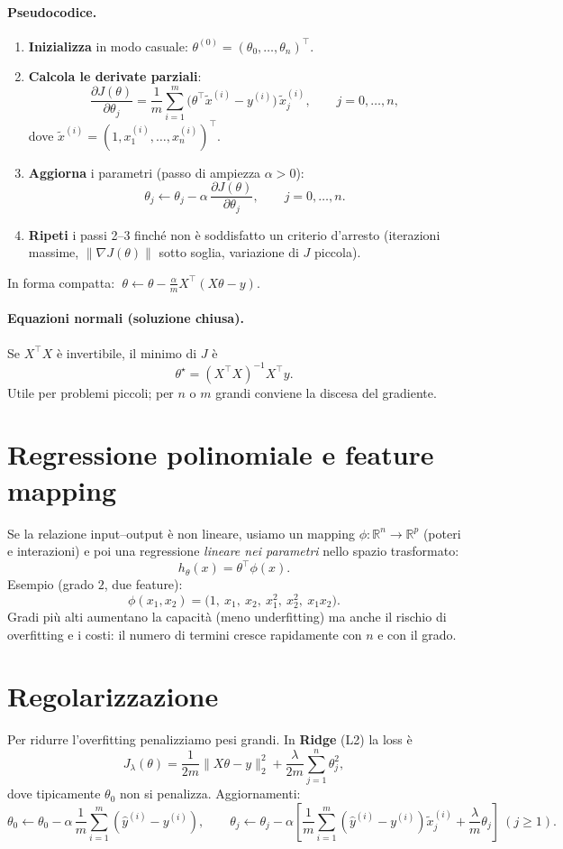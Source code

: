 \paragraph{Pseudocodice.}
\begin{enumerate}
  \item \textbf{Inizializza} in modo casuale: \(\theta^{(0)}=(\theta_0,\ldots,\theta_n)^\top\).
  \item \textbf{Calcola le derivate parziali}:
  \[
  \frac{\partial J(\theta)}{\partial \theta_j}
  =\frac{1}{m}\sum_{i=1}^m\big(\theta^\top \tilde x^{(i)}-y^{(i)}\big)\,\tilde x^{(i)}_j,\qquad j=0,\ldots,n,
  \]
  dove \(\tilde x^{(i)}=(1,x^{(i)}_1,\ldots,x^{(i)}_n)^\top\).
  \item \textbf{Aggiorna} i parametri (passo di ampiezza \(\alpha>0\)):
  \[
  \theta_j \leftarrow \theta_j - \alpha\,\frac{\partial J(\theta)}{\partial \theta_j},
  \qquad j=0,\ldots,n.
  \]
  \item \textbf{Ripeti} i passi 2–3 finché non è soddisfatto un criterio d’arresto
  (iterazioni massime, \(\|\nabla J(\theta)\|\) sotto soglia, variazione di \(J\) piccola).
\end{enumerate}
In forma compatta: \(\;\theta \leftarrow \theta - \frac{\alpha}{m}X^\top(X\theta-y)\).

\paragraph{Equazioni normali (soluzione chiusa).}
Se \(X^\top X\) è invertibile, il minimo di \(J\) è
\[
\theta^\star=(X^\top X)^{-1}X^\top y.
\]
Utile per problemi piccoli; per \(n\) o \(m\) grandi conviene la discesa del gradiente.

\section{Regressione polinomiale e feature mapping}
Se la relazione input–output è non lineare, usiamo un mapping
\(\phi:\mathbb{R}^{n}\to\mathbb{R}^{p}\) (poteri e interazioni) e poi una regressione
\emph{lineare nei parametri} nello spazio trasformato:
\[
h_\theta(x)=\theta^\top \phi(x).
\]
Esempio (grado \(2\), due feature):
\[
\phi(x_1,x_2)=\big(1,\ x_1,\ x_2,\ x_1^2,\ x_2^2,\ x_1x_2\big).
\]
Gradi più alti aumentano la capacità (meno underfitting) ma anche il rischio di overfitting
e i costi: il numero di termini cresce rapidamente con \(n\) e con il grado.

\section{Regolarizzazione}
Per ridurre l’overfitting penalizziamo pesi grandi. In \textbf{Ridge} (L2) la loss è
\[
J_\lambda(\theta)=\frac{1}{2m}\|X\theta-y\|_2^2+\frac{\lambda}{2m}\sum_{j=1}^{n}\theta_j^2,
\]
dove tipicamente \(\theta_0\) non si penalizza. Aggiornamenti:
\[
\theta_0\leftarrow \theta_0-\alpha\,\frac{1}{m}\sum_{i=1}^m(\hat y^{(i)}-y^{(i)}),\qquad
\theta_j\leftarrow \theta_j-\alpha\left[\frac{1}{m}\sum_{i=1}^m(\hat y^{(i)}-y^{(i)})\tilde x^{(i)}_j+\frac{\lambda}{m}\theta_j\right]\ (j\ge 1).
\]

